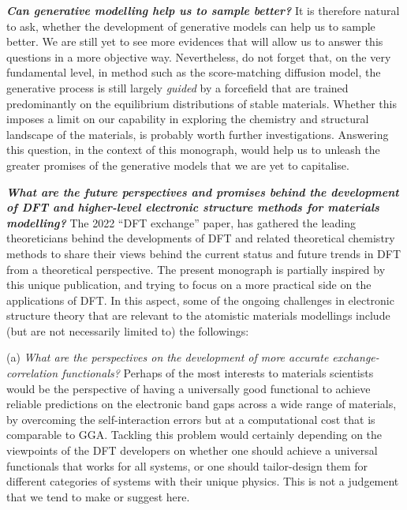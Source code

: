 \textit{\textbf{Can generative modelling help us to sample better?}} It is therefore natural to ask, whether the development of generative models can help us to sample better. We are still yet to see more evidences that will allow us to answer this questions in a more objective way. Nevertheless, do not forget that, on the very fundamental level, in method such as the score-matching diffusion model,\cite{song2019generative} the generative process is still largely \emph{guided} by a forcefield\cite{cheng2024response} that are trained predominantly on the equilibrium distributions of stable materials. Whether this imposes a limit on our capability in exploring the chemistry and structural landscape of the materials, is probably worth further investigations. Answering this question, in the context of this monograph, would help us to unleash the greater promises of the generative models that we are yet to capitalise. 

\emph{\textbf{What are the future perspectives and promises behind the development of DFT and higher-level electronic structure methods for materials modelling?}} The 2022 ``DFT exchange'' paper,\cite{dftexchange} has gathered the leading theoreticians behind the developments of DFT and related theoretical chemistry methods to share their views behind the current status and future trends in DFT from a theoretical perspective. The present monograph is partially inspired by this unique publication, and trying to focus on a more practical side on the applications of DFT. In this aspect, some of the ongoing challenges in electronic structure theory that are relevant to the atomistic materials modellings include (but are not necessarily limited to) the followings:

(a) \emph{What are the perspectives on the development of more accurate exchange-correlation functionals?} Perhaps of the most interests to materials scientists would be the perspective of having a universally good functional to achieve reliable predictions on the electronic band gaps across a wide range of materials, by overcoming the self-interaction errors but at a computational cost that is comparable to GGA. Tackling this problem would certainly depending on the viewpoints of the DFT developers on whether one should achieve a universal functionals that works for all systems, or one should tailor-design them  for different categories of systems with their unique physics.\cite{mardirossian2016accurate} This is not a judgement that we tend to make or suggest here.

